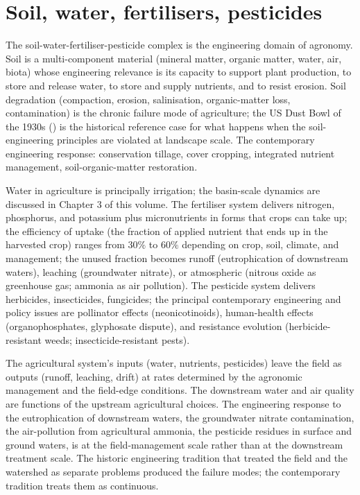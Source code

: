 \section{Soil, water, fertilisers, pesticides}

The soil-water-fertiliser-pesticide complex is the engineering domain of agronomy. Soil is a multi-component material (mineral matter, organic matter, water, air, biota) whose engineering relevance is its capacity to support plant production, to store and release water, to store and supply nutrients, and to resist erosion. Soil degradation (compaction, erosion, salinisation, organic-matter loss, contamination) is the chronic failure mode of agriculture; the US Dust Bowl of the 1930s (\cite{hist:worster-dustbowl-1979}) is the historical reference case for what happens when the soil-engineering principles are violated at landscape scale. The contemporary engineering response: conservation tillage, cover cropping, integrated nutrient management, soil-organic-matter restoration.

Water in agriculture is principally irrigation; the basin-scale dynamics are discussed in Chapter 3 of this volume. The fertiliser system delivers nitrogen, phosphorus, and potassium plus micronutrients in forms that crops can take up; the efficiency of uptake (the fraction of applied nutrient that ends up in the harvested crop) ranges from $30\%$ to $60\%$ depending on crop, soil, climate, and management; the unused fraction becomes runoff (eutrophication of downstream waters), leaching (groundwater nitrate), or atmospheric (nitrous oxide as greenhouse gas; ammonia as air pollution). The pesticide system delivers herbicides, insecticides, fungicides; the principal contemporary engineering and policy issues are pollinator effects (neonicotinoids), human-health effects (organophosphates, glyphosate dispute), and resistance evolution (herbicide-resistant weeds; insecticide-resistant pests).

\begin{principle}
The agricultural system's inputs (water, nutrients, pesticides) leave the field as outputs (runoff, leaching, drift) at rates determined by the agronomic management and the field-edge conditions. The downstream water and air quality are functions of the upstream agricultural choices. The engineering response to the eutrophication of downstream waters, the groundwater nitrate contamination, the air-pollution from agricultural ammonia, the pesticide residues in surface and ground waters, is at the field-management scale rather than at the downstream treatment scale. The historic engineering tradition that treated the field and the watershed as separate problems produced the failure modes; the contemporary tradition treats them as continuous.
\end{principle}


